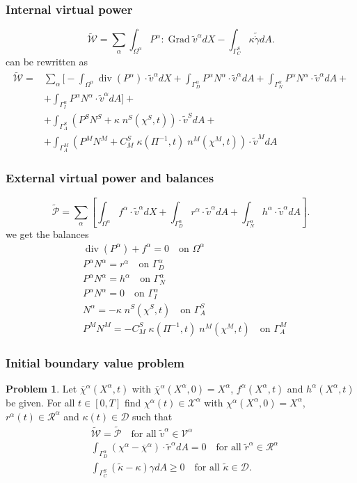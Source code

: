 \documentclass[8pt]{beamer}
\numberwithin{equation}{section}
\theoremstyle{definition}
\newtheorem{prb}[prop]{Problem}
\DeclareMathOperator{\Grad}{Grad}
\DeclareMathOperator{\diver}{div}
\begin{document}
\begin{frame}
\frametitle{Internal virtual power}
\[
\tilde{\mathscr{\mathcal{W}}}=\sum_\alpha\int_{\Omega^\alpha} P^\alpha:\Grad\tilde v^\alpha dX-\int_{\Gamma_C^S}\kappa\tilde{\dot\gamma}dA.
\]
can be rewritten as
\[
\begin{split}
\tilde{\mathcal{W}}=&\sum_\alpha\bigg[-\int_{\Omega^\alpha}\diver(P^\alpha)\cdot\tilde v^\alpha dX+\int_{\Gamma_D^\alpha}P^\alpha N^\alpha\cdot\tilde v^\alpha dA+\int_{\Gamma_N^\alpha}P^\alpha N^\alpha\cdot\tilde v^\alpha dA+\\
&+\int_{\Gamma_I^\alpha}P^\alpha N^\alpha\cdot\tilde v^\alpha dA\bigg]+ \\
&+\int_{\Gamma_A^S}\left(P^S N^S+\kappa\;n^S(\chi^S,t)\right)\cdot\tilde v^SdA+\\
&+\int_{\Gamma_A^M}\left(P^M N^M+C_M^S\;\kappa(\Pi^{-1},t)\;n^M(\chi^M,t)\right)\cdot\tilde v^MdA
\end{split}
\]
\end{frame}

\begin{frame}
\frametitle{External virtual power and balances}
\[
\tilde{\mathcal{P}}=\sum_\alpha\left[\int_{\Omega^\alpha}f^\alpha\cdot\tilde v^\alpha dX+\int_{\Gamma_D^\alpha}r^\alpha\cdot\tilde v^\alpha dA+\int_{\Gamma_N^\alpha}h^\alpha\cdot\tilde v^\alpha dA\right].
\]
we get the balances
\begin{align*}
&\diver(P^\alpha)+f^\alpha=0\quad\text{on $\Omega^\alpha$} \\
&P^\alpha N^\alpha=r^\alpha\quad\text{on $\Gamma_D^\alpha$} \\
&P^\alpha N^\alpha=h^\alpha\quad\text{on $\Gamma_N^\alpha$} \\
&P^\alpha N^\alpha=0\quad\text{on $\Gamma_I^\alpha$} \\
&N^\alpha=-\kappa\;n^S(\chi^S,t)\quad\text{on $\Gamma_A^S$} \\
&P^MN^M=-C^S_M\;\kappa(\Pi^{-1},t)\;n^M(\chi^M,t)\quad\text{on $\Gamma_A^M$}
\end{align*}
\end{frame}

\begin{frame}
\frametitle{Initial boundary value problem}
\begin{prb}
Let $\overline{\chi}^\alpha(X^\alpha,t)$ with $\overline{\chi}^\alpha(X^\alpha,0)=X^\alpha$, $f^\alpha(X^\alpha,t)$ and $h^\alpha(X^\alpha,t)$ be given. For all $t\in[0,T]$ find $\chi^\alpha(t)\in\mathscr{X}^\alpha$ with $\chi^\alpha(X^\alpha,0)=X^\alpha$, $r^\alpha(t)\in\mathscr{R}^\alpha$ and $\kappa(t)\in\mathscr{D}$ such that
\begin{align*}
&\tilde{\mathcal{W}}=\tilde{\mathcal{P}}\quad\text{for all $\tilde v^\alpha\in\mathscr{V}^\alpha$} \\
&\int_{\Gamma_D^\alpha}(\chi^\alpha-\overline{\chi}^\alpha)\cdot\tilde{r}^\alpha dA=0\quad\text{for all $\tilde{r}^\alpha\in\mathscr{R}^\alpha$} \\
&\int_{\Gamma_C^S}(\tilde\kappa-\kappa)\gamma dA\ge0\quad\text{for all $\tilde\kappa\in\mathscr{D}$}.
\end{align*}
\end{prb}
\end{frame}
\end{document}

